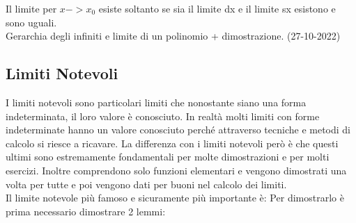 Il limite per $x->x_{0}$ esiste soltanto se sia il limite dx e il limite sx esistono e sono uguali.\\ %
Gerarchia degli infiniti e limite di un polinomio + dimostrazione. (27-10-2022) %


\subsection{Limiti Notevoli} \label{LimitiNotevoli}
I limiti notevoli sono particolari limiti che nonostante siano una forma indeterminata, il loro valore è conosciuto. In realtà molti limiti con forme indeterminate hanno un valore conosciuto perché attraverso tecniche e metodi di calcolo si riesce a ricavare. La differenza con i limiti notevoli però è che questi ultimi sono estremamente fondamentali per molte dimostrazioni e per molti esercizi. Inoltre comprendono solo funzioni elementari e vengono dimostrati una volta per tutte e poi vengono dati per buoni nel calcolo dei limiti.\\
Il limite notevole più famoso e sicuramente più importante è:
Per dimostrarlo è prima necessario dimostrare 2 lemmi:
